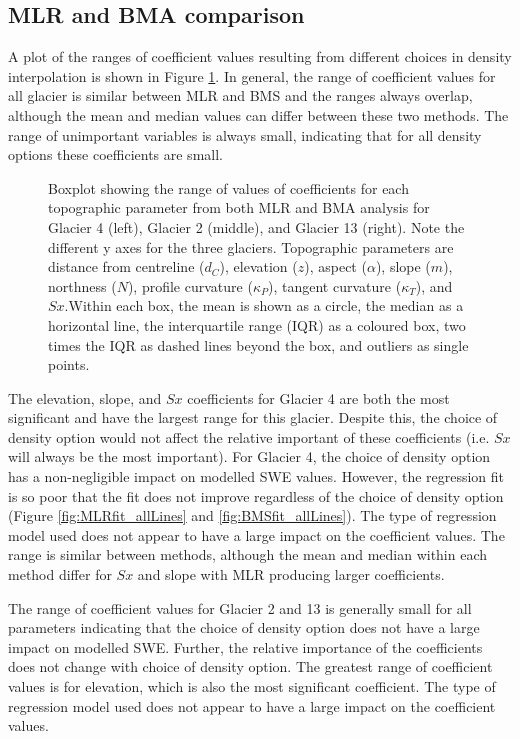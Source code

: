 \documentclass[12pt]{article}
\newcommand{\params}{Topographic parameters are distance from centreline ($d_C$), elevation ($z$), aspect ($\alpha$), slope ($m$), northness ($N$), profile curvature ($\kappa_P$), tangent curvature ($\kappa_T$), and $Sx$.}
\newcommand{\boxplot}{Within each box, the mean is shown as a circle, the median as a horizontal line, the interquartile range (IQR) as a coloured box, two times the IQR as dashed lines beyond the box, and outliers as single points.}
\begin{document}
\subsection{MLR and BMA comparison}

A plot of the ranges of coefficient values resulting from different choices in density interpolation is shown in Figure \ref{fig:allCeoffs_boxplot}. In general, the range of coefficient values for all glacier is similar between MLR and BMS and the ranges always overlap, although the mean and median values can differ between these two methods. The range of unimportant variables is always small, indicating that for all density options these coefficients are small. 

\begin{figure}[H]
	\caption{Boxplot showing the range of values of coefficients for each topographic parameter from both MLR and BMA analysis for Glacier 4 (left), Glacier 2 (middle), and Glacier 13 (right). Note the different y axes for the three glaciers. \params \boxplot}
	\label{fig:allCeoffs_boxplot}
\end{figure}

The elevation, slope, and $Sx$ coefficients for Glacier 4 are both the most significant and have the largest range for this glacier. Despite this, the choice of density option would not affect the relative important of these coefficients (i.e. $Sx$ will always be the most important). For Glacier 4, the choice of density option has a non-negligible impact on modelled SWE values. However, the regression fit is so poor that the fit does not improve regardless of the choice of density option (Figure \ref{fig:MLRfit_allLines} and \ref{fig:BMSfit_allLines}). The type of regression model used does not appear to have a large impact on the coefficient values. The range is similar between methods, although the mean and median within each method differ for $Sx$ and slope with MLR producing larger coefficients.

The range of coefficient values for Glacier 2 and 13 is generally small for all parameters indicating that the choice of density option does not have a large impact on modelled SWE. Further, the relative importance of the coefficients does not change with choice of density option. The greatest range of coefficient values is for elevation, which is also the most significant coefficient. The type of regression model used does not appear to have a large impact on the coefficient values.
\end{document}
